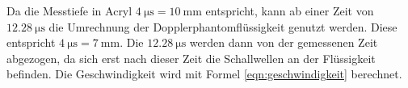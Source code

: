 Da die Messtiefe in Acryl $\qty{4}{\micro\second}=\qty{10}{\milli\meter}$ entspricht, kann ab einer Zeit von $\qty{12.28}{\micro\second}$ die Umrechnung der Dopplerphantomflüssigkeit genutzt werden.
Diese entspricht $\qty{4}{\micro\second}=\qty{7}{\milli\meter}$.
Die $\qty{12.28}{\micro\second}$ werden dann von der gemessenen Zeit abgezogen, da sich erst nach dieser Zeit die Schallwellen an der Flüssigkeit befinden.
Die Geschwindigkeit wird mit Formel \ref{eqn:geschwindigkeit} berechnet.